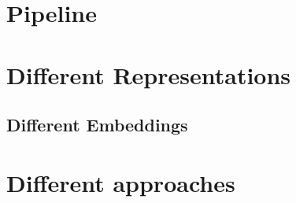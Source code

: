 \section{Pipeline}

\section{Different Representations}
\label{section:representations}
\subsection{Different Embeddings}
\label{subsection:embeddings}


\section{Different approaches}
